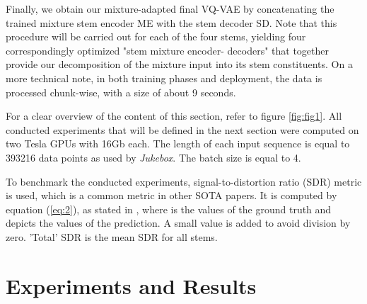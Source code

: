 \documentclass{llncs}
\begin{document}
Finally, we
obtain  our  mixture-adapted  final  VQ-VAE  by  concatenating  the
trained mixture stem encoder ME with the stem decoder SD. Note
that this procedure will be carried out for each of the four stems,
yielding  four correspondingly optimized  "stem  mixture  encoder-
decoders" that together provide our decomposition of the mixture input into its stem constituents. On a more technical note, in both training phases and deployment, the data is processed chunk-wise, with a size of about 9 seconds.


For a clear overview of the content of this section, refer to figure \ref{fig:fig1}. All conducted experiments that will be defined in the next section were computed on  two Tesla GPUs with 16Gb each. The length of each input sequence is equal to 393216 data points as used by \textit{Jukebox}. The batch size is equal to 4.










To benchmark the conducted experiments, signal-to-distortion ratio (SDR) metric is used, which is a common metric in other SOTA papers\cite{DBLP:journals/corr/abs-1909-01174}\cite{Stoeter2019}\cite{Hennequin2020}\cite{sawata2021all}\cite{stoller2018waveunet}. 
It is computed by equation (\ref{eq:2}), as stated in \cite{musicDemixing}, where  is the values of the ground truth and  depicts the values of the prediction. A small value  is added to avoid division by zero. 'Total' SDR is the mean SDR for all stems.


\section{Experiments and Results}

\begin{table}[htb]
\centering
{}
\caption{Comparison of SDR values per stem and in total for three different versions of our approach.}
\label{tab:sdr_tab_our_approach}
\end{table}
\end{document}
